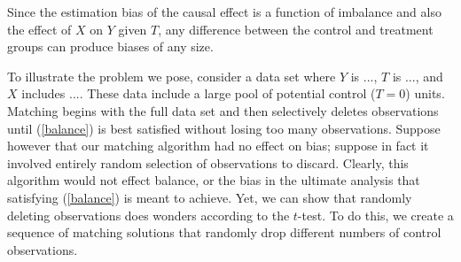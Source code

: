 \documentclass[11pt,titlepage]{article}
\begin{document}
Since the estimation bias of the causal
effect is a function of imbalance and also the effect of $X$ on $Y$
given $T$, any difference between the control and treatment groups can
produce biases of any size.




To illustrate the problem we pose, consider a data set where $Y$ is
..., $T$ is ..., and $X$ includes ....  These data include a large
pool of potential control ($T=0$) units.  Matching begins with the
full data set and then selectively deletes observations until
(\ref{balance}) is best satisfied without losing too many
observations.  Suppose however that our matching algorithm had no
effect on bias; suppose in fact it involved entirely random selection
of observations to discard.  Clearly, this algorithm would not effect
balance, or the bias in the ultimate analysis that satisfying
(\ref{balance}) is meant to achieve.  Yet, we can show that randomly
deleting observations does wonders according to the $t$-test.  To do
this, we create a sequence of matching solutions that randomly drop
different numbers of control observations.  
\end{document}
